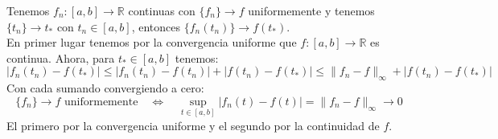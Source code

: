 \begin{ejercicio} %
    Tenemos $f_n:[a,b]\to \mathbb{R}$ continuas con $\{f_n\}\to f$ uniformemente y tenemos $\{t_n\}\to t_\ast$ con $t_n \in [a,b]$, entonces $\{f_n(t_n)\}\to f(t_\ast)$.\\

    \noindent
    En primer lugar tenemos por la convergencia uniforme que $f:[a,b]\to \mathbb{R}$  es continua. Ahora, para $t_\ast \in [a,b]$ tenemos:
    \begin{equation*}
        |f_n(t_n)-f(t_\ast)| \leq |f_n(t_n)-f(t_n)| + |f(t_n)-f(t_\ast)| \leq \|f_n-f\|_\infty + |f(t_n)-f(t_\ast)|
    \end{equation*}
    Con cada sumando convergiendo a cero:
    \begin{equation*}
        \{f_n\}\to f \text{\ uniformemente} \quad\Longleftrightarrow\quad \sup_{t\in [a,b]}|f_n(t)-f(t)| = \|f_n-f\|_\infty \to 0
    \end{equation*}
    El primero por la convergencia uniforme y el segundo por la continuidad de $f$.

\end{ejercicio}

